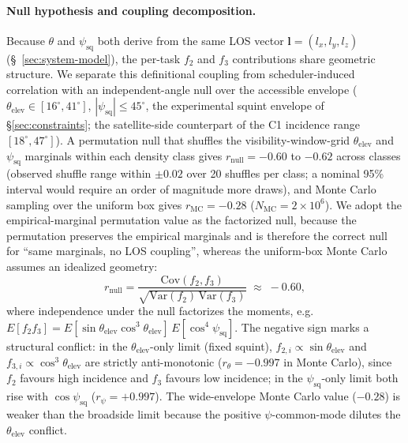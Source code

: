 \documentclass[preprint,12pt,authoryear]{elsarticle}
\begin{document}
\paragraph{Null hypothesis and coupling decomposition.}\label{par:null-decomposition}
Because $\theta$ and $\psi_{\text{sq}}$ both derive from the same LOS vector
$\mathbf{l} = (l_x, l_y, l_z)$ (\S~\ref{sec:system-model}), the per-task $f_2$
and $f_3$ contributions share geometric structure. We separate this
definitional coupling from scheduler-induced correlation with an
independent-angle null over the accessible envelope
($\theta_{\text{elev}} \in [16^\circ, 41^\circ]$,
$|\psi_{\text{sq}}| \leq 45^\circ$, the experimental squint envelope of
\S\ref{sec:constraints}; the satellite-side counterpart of the C1 incidence
range $[18^\circ, 47^\circ]$). A permutation null that shuffles the
visibility-window-grid $\theta_{\text{elev}}$ and $\psi_{\text{sq}}$ marginals
within each density class gives $r_{\text{null}} = -0.60$ to $-0.62$ across
classes (observed shuffle range within $\pm 0.02$ over 20 shuffles per class;
a nominal 95\% interval would require an order of magnitude more draws), and
Monte Carlo sampling over the
uniform box gives $r_{\text{MC}} = -0.28$ ($N_{\text{MC}} = 2\times 10^6$). We
adopt the empirical-marginal permutation value as the factorized null,
because the permutation preserves the empirical marginals and is therefore
the correct null for ``same marginals, no LOS coupling'', whereas the
uniform-box Monte Carlo assumes an idealized geometry:
\begin{equation}
r_{\text{null}} = \frac{\mathrm{Cov}(f_2, f_3)}{\sqrt{\mathrm{Var}(f_2)\,\mathrm{Var}(f_3)}} \;\approx\; -0.60,
\label{eq:rnull}
\end{equation}
where independence under the null factorizes the moments, e.g.\
$E[f_2 f_3] = E[\sin\theta_{\text{elev}}\cos^3\theta_{\text{elev}}]\,E[\cos^4\psi_{\text{sq}}]$.
The negative sign marks a structural conflict: in the
$\theta_{\text{elev}}$-only limit (fixed squint), $f_{2,i} \propto
\sin\theta_{\text{elev}}$ and $f_{3,i} \propto \cos^3\theta_{\text{elev}}$ are
strictly anti-monotonic ($r_\theta = -0.997$ in Monte Carlo), since $f_2$
favours high incidence and $f_3$ favours low incidence; in the
$\psi_{\text{sq}}$-only limit both rise with $\cos\psi_{\text{sq}}$
($r_\psi = +0.997$). The wide-envelope Monte Carlo value ($-0.28$) is weaker
than the broadside limit because the positive $\psi$-common-mode dilutes the
$\theta_{\text{elev}}$ conflict.
\end{document}
